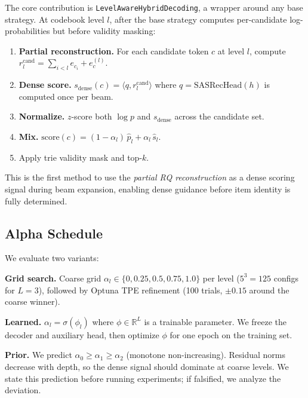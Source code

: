 The core contribution is \texttt{LevelAwareHybridDecoding}, a wrapper around any base strategy. At codebook level $l$, after the base strategy computes per-candidate log-probabilities but before validity masking:

\begin{enumerate}
  \item \textbf{Partial reconstruction.} For each candidate token $c$ at level $l$, compute $r_l^{\text{cand}} = \sum_{i < l} e_{c_i} + e_c^{(l)}$.
  \item \textbf{Dense score.} $s_{\text{dense}}(c) = \langle q, r_l^{\text{cand}} \rangle$ where $q = \text{SASRecHead}(h)$ is computed once per beam.
  \item \textbf{Normalize.} $z$-score both $\log p$ and $s_{\text{dense}}$ across the candidate set.
  \item \textbf{Mix.} $\text{score}(c) = (1 - \alpha_l)\,\hat{p}_l + \alpha_l\,\hat{s}_l$.
  \item Apply trie validity mask and top-$k$.
\end{enumerate}

This is the first method to use the \emph{partial RQ reconstruction} as a dense scoring signal during beam expansion, enabling dense guidance before item identity is fully determined.

\subsection{Alpha Schedule}

We evaluate two variants:

\textbf{Grid search.} Coarse grid $\alpha_l \in \{0, 0.25, 0.5, 0.75, 1.0\}$ per level ($5^3 = 125$ configs for $L=3$), followed by Optuna TPE refinement (100 trials, $\pm 0.15$ around the coarse winner).

\textbf{Learned.} $\alpha_l = \sigma(\phi_l)$ where $\phi \in \mathbb{R}^L$ is a trainable parameter. We freeze the decoder and auxiliary head, then optimize $\phi$ for one epoch on the training set.

\textbf{Prior.} We predict $\alpha_0 \ge \alpha_1 \ge \alpha_2$ (monotone non-increasing). Residual norms decrease with depth, so the dense signal should dominate at coarse levels. We state this prediction before running experiments; if falsified, we analyze the deviation.
